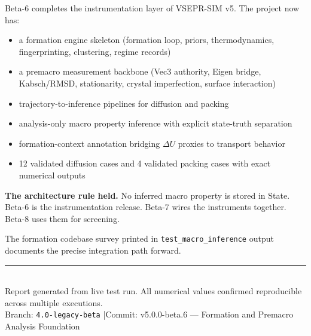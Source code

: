 \documentclass[11pt,a4paper]{article}
\begin{document}
Beta-6 completes the instrumentation layer of VSEPR-SIM v5. The project now has:

\begin{itemize}
	\item a formation engine skeleton (formation loop, priors, thermodynamics, fingerprinting, clustering, regime records)
	\item a premacro measurement backbone (Vec3 authority, Eigen bridge, Kabsch/RMSD, stationarity, crystal imperfection, surface interaction)
	\item trajectory-to-inference pipelines for diffusion and packing
	\item analysis-only macro property inference with explicit state-truth separation
	\item formation-context annotation bridging $\Delta U$ proxies to transport behavior
	\item 12 validated diffusion cases and 4 validated packing cases with exact numerical outputs
\end{itemize}

\begin{docnote}
\textbf{The architecture rule held.} No inferred macro property is stored in State.\\[0.4em]
Beta-6 is the instrumentation release. Beta-7 wires the instruments together. Beta-8 uses
them for screening.
\end{docnote}

The formation codebase survey printed in \texttt{test\_macro\_inference} output documents the
precise integration path forward.

\vfill
\noindent\rule{\linewidth}{0.4pt}\\[0.3em]
{\small\color{gray}
Report generated from live test run. All numerical values confirmed reproducible across multiple
executions.\\
Branch: \texttt{4.0-legacy-beta} \quad|\quad Commit: v5.0.0-beta.6 --- Formation and Premacro
Analysis Foundation
}
\end{document}

